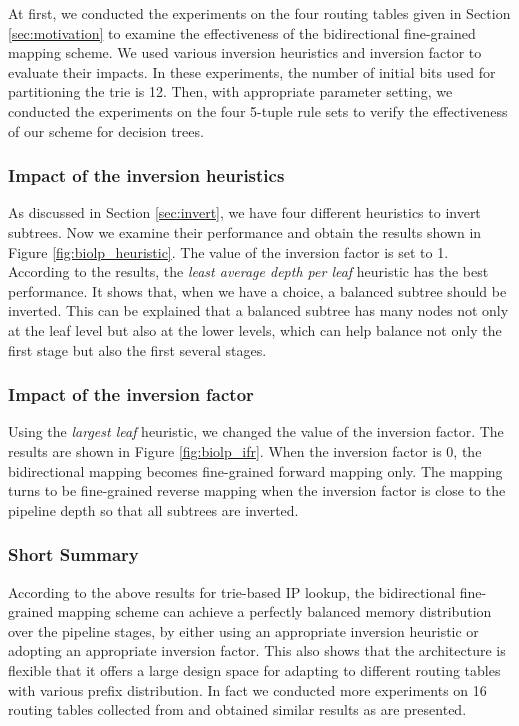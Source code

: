 \documentclass{sigcomm-alternate}
\begin{document}
At first, we conducted the experiments on the four routing tables given in Section \ref{sec:motivation} to examine the effectiveness of the bidirectional fine-grained mapping scheme. We used various inversion heuristics and inversion factor to evaluate their impacts. In these experiments, the number of initial bits used for partitioning the trie is 12. Then, with appropriate parameter setting, we conducted the experiments on the four 5-tuple rule sets to verify the effectiveness of our scheme for decision trees.  

\subsubsection{Impact of the inversion heuristics} 

As discussed in Section \ref{sec:invert}, we have four different heuristics to invert subtrees. Now we examine their performance and obtain the results shown in Figure \ref{fig:biolp_heuristic}. The value of the inversion factor is set to 1. According to the results, the \textit{least average depth per leaf} heuristic has the best performance. It shows that, when we have a choice, a balanced subtree should be inverted. This can be explained that a balanced subtree has many nodes not only at the leaf level but also at the lower levels, which can help balance not only the first stage but also the first several stages.

\subsubsection{Impact of the inversion factor}

Using the \textit{largest leaf} heuristic, we changed the value of the inversion factor. The results are shown in Figure \ref{fig:biolp_ifr}. 
When the inversion factor is 0, the bidirectional mapping becomes fine-grained forward mapping only. The mapping turns to be fine-grained reverse mapping when the inversion factor is close to the pipeline depth so that all subtrees are inverted. 



\subsubsection{Short Summary}

According to the above results for trie-based IP lookup, the bidirectional fine-grained mapping scheme can achieve a perfectly balanced memory distribution over the pipeline stages, by either using an appropriate inversion heuristic or adopting an appropriate inversion factor. This also shows that the architecture is flexible that it offers a large design space for adapting to different routing tables with various prefix distribution. In fact we conducted more experiments on 16 routing tables collected from \cite{ripe:ris} and obtained similar results as are presented.
\end{document}
